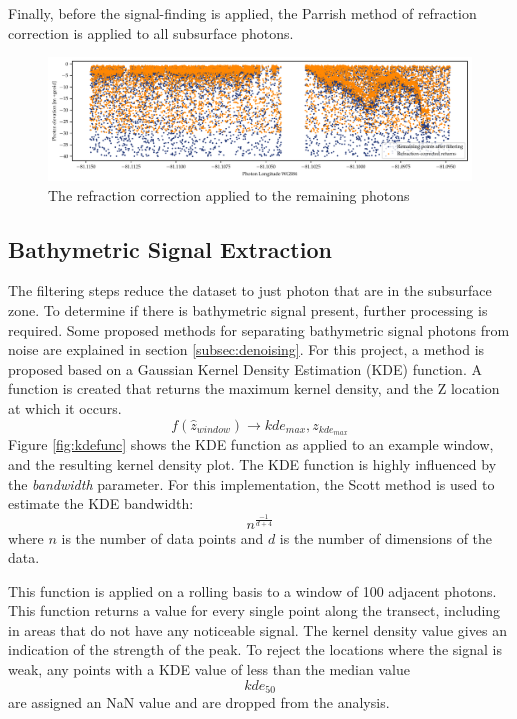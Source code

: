 Finally, before the signal-finding is applied, the Parrish method of refraction correction is applied to all subsurface photons.

\begin{figure}[h]
    \centering
    \includegraphics[width=\textwidth]{figures/methodology_refraction.pdf}
    \caption{The refraction correction applied to the remaining photons}
    \label{fig:refraction-photons}
\end{figure}

\subsection{Bathymetric Signal Extraction}\label{sec:kdesignalfinding}

The filtering steps reduce the dataset to just photon that are in the subsurface zone. To determine if there is bathymetric signal present, further processing is required. Some proposed methods for separating bathymetric signal photons from noise are explained in section \ref{subsec:denoising}. For this project, a method is proposed based on a Gaussian Kernel Density Estimation (KDE) function. A function is created that returns the maximum kernel density, and the Z location at which it occurs. $$ f(\hat{z}_{window}) \rightarrow kde_{max},z_{kde_{max}} $$ Figure \ref{fig:kdefunc} shows the KDE function as applied to an example window, and the resulting kernel density plot. The KDE function is highly influenced by the \emph{bandwidth} parameter. For this implementation, the Scott method \parencite{Scott2015} is used to estimate the KDE bandwidth: $$ n^{\frac{-1}{d+4}} $$ where $n$ is the number of data points and $d$ is the number of dimensions of the data.

This function is applied on a rolling basis to a window of 100 adjacent photons. This function returns a value for every single point along the transect, including in areas that do not have any noticeable signal. The kernel density value gives an indication of the strength of the peak. To reject the locations where the signal is weak, any points with a KDE value of less than the median value $$ kde_{50} $$  are assigned an NaN value and are dropped from the analysis.

